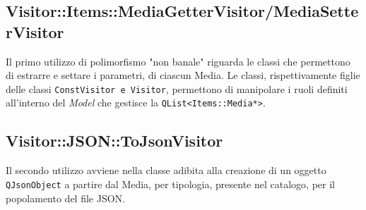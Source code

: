 \documentclass[a4paper,10pt]{article}
\begin{document}
	\subsection{Visitor::Items::MediaGetterVisitor/MediaSetterVisitor}
	Il primo utilizzo di polimorfismo "non banale" riguarda le classi che permettono di estrarre e settare i parametri, di ciascun Media. Le classi, rispettivamente figlie delle classi \texttt{ConstVisitor e Visitor}, permettono di manipolare i ruoli definiti all'interno del \textit{Model} che gestisce la \texttt{QList<Items::Media*>}.
	
	\subsection{Visitor::JSON::ToJsonVisitor}
	Il secondo utilizzo avviene nella classe adibita alla creazione di un oggetto \texttt{QJsonObject} a partire dal Media, per tipologia, presente nel catalogo, per il popolamento del file JSON.
	
\end{document}
